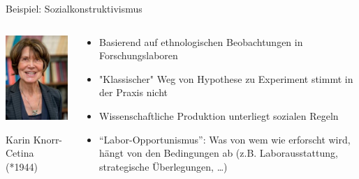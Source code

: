 \documentclass{beamer}
\begin{document}
\begin{frame}{Beispiel: Sozialkonstruktivismus}
    
\begin{columns}[c]


\begin{column}{5cm}

\includegraphics[width=\textwidth]{Knorr_Cetina_Karen.jpg}


Karin Knorr-Cetina (*1944)
    
\end{column}




\begin{column}{6cm}
\begin{itemize}
\item 
Basierend auf ethnologischen Beobachtungen in Forschungslaboren
    \item
"Klassischer" Weg von Hypothese zu Experiment stimmt in der Praxis nicht
    \item
    Wissenschaftliche Produktion unterliegt sozialen Regeln
    \item 
    ``Labor-Opportunismus'': Was von wem wie erforscht wird, hängt von den Bedingungen ab (z.B. Laborausstattung, strategische Überlegungen, \dots) 
    
\end{itemize}

    
\end{column}


    
\end{columns}

\end{frame}
\end{document}
